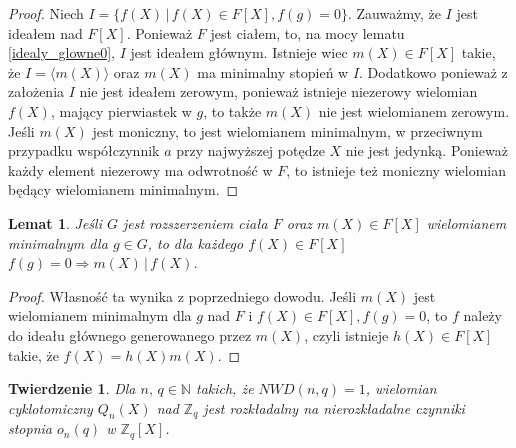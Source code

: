 \documentclass[declaration,shortabstract]{iithesis}
\theoremstyle{definition}
\theoremstyle{remark} \newtheorem{observation}{Obserwacja}
\theoremstyle{plain} \newtheorem{theorem}{Twierdzenie}
\theoremstyle{plain} \newtheorem{lemma}{Lemat}
\theoremstyle{remark} \newtheorem*{remark*}{Uwaga}
\theoremstyle{reminder} \newtheorem*{reminder*}{Przypomnienie}
\begin{document}
	
\begin{proof}
	Niech $I = \{f(X) \, | \, f(X) \in F[X], f(g) = 0\}$. Zauważmy, że $I$ jest ideałem nad $F[X]$. Ponieważ $F$ jest ciałem, to, na mocy lematu \ref{idealy_glowne0}, $I$ jest ideałem głównym. Istnieje wiec $m(X) \in F[X]$ takie, że $I = \langle m(X) \rangle$ oraz $m(X)$ ma minimalny stopień w $I$. Dodatkowo ponieważ z założenia $I$ nie jest ideałem zerowym, ponieważ istnieje niezerowy wielomian $f(X)$, mający pierwiastek w $g$, to także $m(X)$ nie jest wielomianem zerowym. Jeśli $m(X)$ jest moniczny, to jest wielomianem minimalnym, w przeciwnym przypadku współczynnik $a$ przy najwyższej potędze $X$ nie jest jedynką. Ponieważ każdy element niezerowy ma odwrotność w $F$, to istnieje też moniczny wielomian będący wielomianem minimalnym.
\end{proof}
	
\begin{lemma}
	Jeśli $G$ jest rozszerzeniem ciała $F$ oraz $m(X) \in F[X]$ wielomianem minimalnym dla $g \in G$, to dla każdego $f(X) \in F[X]$ $f(g) = 0 \Rightarrow m(X) \, | \, f(X)$.
\end{lemma}
	
\begin{proof}
	Własność ta wynika z poprzedniego dowodu. Jeśli $m(X)$ jest wielomianem minimalnym dla $g$ nad $F$ i $f(X) \in F[X], f(g) = 0$, to $f$ należy do ideału głównego generowanego przez $m(X)$, czyli istnieje $h(X) \in F[X]$ takie, że $f(X) = h(X)m(X)$.
\end{proof}
	
\begin{theorem} \label{kluczowe}
	Dla $n, \, q \in \mathbb{N}$ takich, że $NWD(n, q) = 1$, wielomian cyklotomiczny $Q_n(X)$ nad $\mathbb{Z}_q$ jest rozkładalny na nierozkładalne czynniki stopnia $o_n(q)$ w $\mathbb{Z}_q[X]$.
\end{theorem}
	
\end{document}
